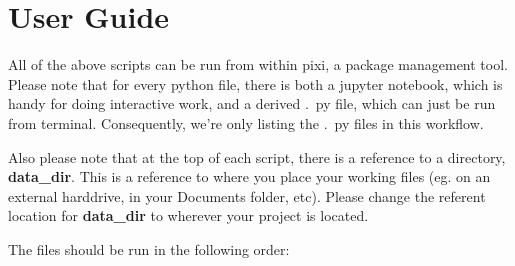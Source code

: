 \documentclass{article}
\begin{document}
\section{User Guide}

All of the above scripts can be run from within pixi, a package management tool. 
Please note that for every python file, there is both a jupyter notebook, which is handy for doing interactive work, and a derived .~py file, which can just be run from terminal. Consequently, we’re only listing the .~py files in this workflow.

Also please note that at the top of each script, there is a reference to a directory, \textbf{data\_dir}.
This is a reference to where you place your working files (eg. on an external harddrive, in your Documents folder, etc). 
Please change the referent location for \textbf{data\_dir} to wherever your project is located.

The files should be run in the following order:
\end{document}
